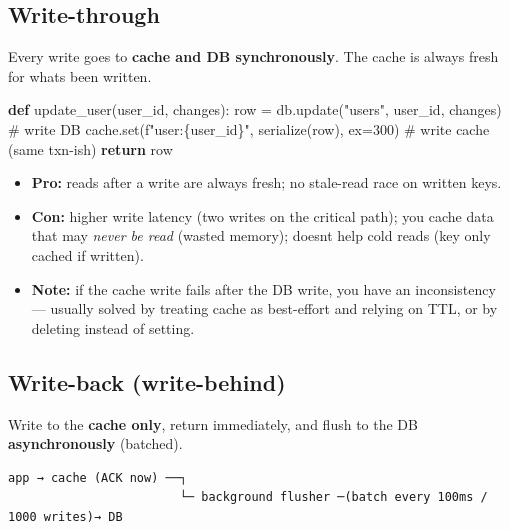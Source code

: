 \documentclass[11pt]{article}
\providecommand{\tightlist}{\setlength{\itemsep}{1pt}\setlength{\parskip}{0pt}}
\newenvironment{Shaded}{\begin{snugshade}}{\end{snugshade}}
\newcommand{\BuiltInTok}[1]{\textcolor[rgb]{0.50,0.55,0.55}{#1}}
\newcommand{\CommentTok}[1]{\textcolor[rgb]{0.48,0.49,0.49}{#1}}
\newcommand{\ControlFlowTok}[1]{\textcolor[rgb]{0.99,0.74,0.29}{\textbf{#1}}}
\newcommand{\DecValTok}[1]{\textcolor[rgb]{0.96,0.45,0.00}{#1}}
\newcommand{\KeywordTok}[1]{\textcolor[rgb]{0.81,0.81,0.76}{\textbf{#1}}}
\newcommand{\NormalTok}[1]{\textcolor[rgb]{0.81,0.81,0.76}{#1}}
\newcommand{\OperatorTok}[1]{\textcolor[rgb]{0.81,0.81,0.76}{#1}}
\newcommand{\SpecialCharTok}[1]{\textcolor[rgb]{0.24,0.68,0.91}{#1}}
\newcommand{\SpecialStringTok}[1]{\textcolor[rgb]{0.85,0.27,0.33}{#1}}
\newcommand{\StringTok}[1]{\textcolor[rgb]{0.96,0.31,0.31}{#1}}
\begin{document}
\subsection{Write-through}\label{write-through}

Every write goes to \textbf{cache and DB synchronously}. The cache is always fresh for what\textquotesingle s been written.


\begin{Shaded}
\begin{Highlighting}[]
\KeywordTok{def}\NormalTok{ update\_user(user\_id, changes):}
\NormalTok{    row }\OperatorTok{=}\NormalTok{ db.update(}\StringTok{"users"}\NormalTok{, user\_id, changes)   }\CommentTok{\# write DB}
\NormalTok{    cache.}\BuiltInTok{set}\NormalTok{(}\SpecialStringTok{f"user:}\SpecialCharTok{\{}\NormalTok{user\_id}\SpecialCharTok{\}}\SpecialStringTok{"}\NormalTok{, serialize(row), ex}\OperatorTok{=}\DecValTok{300}\NormalTok{)  }\CommentTok{\# write cache (same txn{-}ish)}
    \ControlFlowTok{return}\NormalTok{ row}
\end{Highlighting}
\end{Shaded}

\begin{itemize}
\tightlist
\item
  \textbf{Pro:} reads after a write are always fresh; no stale-read race on written keys.
\item
  \textbf{Con:} higher write latency (two writes on the critical path); you cache data that may \emph{never be read} (wasted memory); doesn\textquotesingle t help cold reads (key only cached if written).
\item
  \textbf{Note:} if the cache write fails after the DB write, you have an inconsistency --- usually solved by treating cache as best-effort and relying on TTL, or by deleting instead of setting.
\end{itemize}

\subsection{Write-back (write-behind)}\label{write-back-write-behind}

Write to the \textbf{cache only}, return immediately, and flush to the DB \textbf{asynchronously} (batched).

\setcodelang{}

\begin{verbatim}
app → cache (ACK now) ──┐
                        └─ background flusher ─(batch every 100ms / 1000 writes)→ DB
\end{verbatim}
\end{document}
